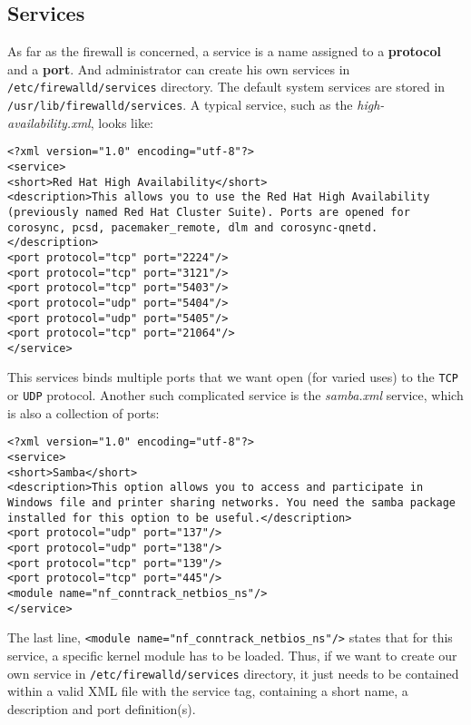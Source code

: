 \subsection{Services}
As far as the firewall is concerned, a service is a name assigned to a \textbf{protocol} and a \textbf{port}. And administrator can create his own services in \verb|/etc/firewalld/services| directory. The default system services are stored in \verb|/usr/lib/firewalld/services|. A typical service, such as the \textit{high-availability.xml}, looks like:

\vspace{-15pt}
\begin{verbatim}
<?xml version="1.0" encoding="utf-8"?>
<service>
<short>Red Hat High Availability</short>
<description>This allows you to use the Red Hat High Availability (previously named Red Hat Cluster Suite). Ports are opened for corosync, pcsd, pacemaker_remote, dlm and corosync-qnetd.</description>
<port protocol="tcp" port="2224"/>
<port protocol="tcp" port="3121"/>
<port protocol="tcp" port="5403"/>
<port protocol="udp" port="5404"/>
<port protocol="udp" port="5405"/>
<port protocol="tcp" port="21064"/>
</service>
\end{verbatim}
\vspace{-10pt}

\noindent
This services binds multiple ports that we want open (for varied uses) to the \verb|TCP| or \verb|UDP| protocol. Another such complicated service is the \textit{samba.xml} service, which is also a collection of ports:

\vspace{-15pt}
\begin{verbatim}
<?xml version="1.0" encoding="utf-8"?>
<service>
<short>Samba</short>
<description>This option allows you to access and participate in Windows file and printer sharing networks. You need the samba package installed for this option to be useful.</description>
<port protocol="udp" port="137"/>
<port protocol="udp" port="138"/>
<port protocol="tcp" port="139"/>
<port protocol="tcp" port="445"/>
<module name="nf_conntrack_netbios_ns"/>
</service>
\end{verbatim}
\vspace{-10pt}

\noindent
The last line, \verb|<module name="nf_conntrack_netbios_ns"/>| states that for this service, a specific kernel module has to be loaded. Thus, if we want to create our own service in \verb|/etc/firewalld/services| directory, it just needs to be contained within a valid XML file with the service tag, containing a short name, a description and port definition(s).

